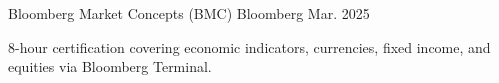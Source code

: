 

\begin{cventries}

  \cventry
    {Bloomberg Market Concepts (BMC)} %
    {Bloomberg} %
    {} %
    {Mar. 2025} %
    {
      \begin{cvitems}
        \item {8-hour certification covering economic indicators, currencies, fixed income, and equities via Bloomberg Terminal.}
      \end{cvitems}
    }

\end{cventries}
